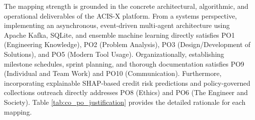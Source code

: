 \documentclass[a4paper, 12pt]{report}
\begin{document}
\begin{table}[H]
    \centering
    \caption{CO-PO/PSO Mapping Matrix}\label{tab:co_po_matrix}
    \renewcommand{\arraystretch}{1.25}
    \setlength{\tabcolsep}{4pt}
\end{table}

The mapping strength is grounded in the concrete architectural, algorithmic, and operational deliverables of the ACIS-X platform. From a systems perspective, implementing an asynchronous, event-driven multi-agent architecture using Apache Kafka, SQLite, and ensemble machine learning directly satisfies PO1 (Engineering Knowledge), PO2 (Problem Analysis), PO3 (Design/Development of Solutions), and PO5 (Modern Tool Usage). Organizationally, establishing milestone schedules, sprint planning, and thorough documentation satisfies PO9 (Individual and Team Work) and PO10 (Communication). Furthermore, incorporating explainable SHAP-based credit risk predictions and policy-governed collections outreach directly addresses PO8 (Ethics) and PO6 (The Engineer and Society). Table \ref{tab:co_po_justification} provides the detailed rationale for each mapping.
\end{document}
